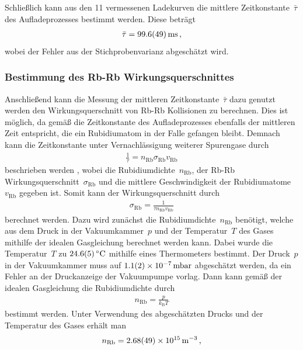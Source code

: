 \documentclass[11pt, a4paper]{article}
\numberwithin{equation}{section}
\begin{document}
Schließlich kann aus den 11 vermessenen Ladekurven die mittlere Zeitkonstante~$\bar{\tau}$ des Aufladeprozesses bestimmt werden.
Diese beträgt
\begin{align*}
	\bar{\tau} = \SI{99.6 +- 4.9}{ms} \, \text{,}
\end{align*}
wobei der Fehler aus der Stichprobenvarianz abgeschätzt wird.

\subsubsection{Bestimmung des Rb-Rb Wirkungsquerschnittes}
Anschließend kann die Messung der mittleren Zeitkonstante~$\bar{\tau}$ dazu genutzt werden den Wirkungsquerschnitt von Rb-Rb Kollisionen zu berechnen.
Dies ist möglich, da gemäß \cite{wieman} die Zeitkonstante des Aufladeprozesses ebenfalls der mittleren Zeit entspricht, die ein Rubidiumatom in der Falle gefangen bleibt.
Demnach kann die Zeitkonstante unter Vernachlässigung weiterer Spurengase durch 
\begin{align*}
	\frac{1}{\tau} = n_\mathrm{Rb}  \sigma_\mathrm{Rb}  v_\mathrm{Rb}
\end{align*}
beschrieben werden \cite{wieman}, wobei die Rubidiumdichte~$n_\mathrm{Rb}$, der Rb-Rb Wirkungsquerschnitt~$\sigma_\mathrm{Rb}$ und die mittlere Geschwindigkeit der Rubidiumatome~$v_\mathrm{Rb}$ gegeben ist.
Somit kann der Wirkungsquerschnitt durch
\begin{align}
	\sigma_\mathrm{Rb} = \frac{1}{\tau n_\mathrm{Rb} v_\mathrm{Rb}}
	\label{eq:cross_sec}
\end{align}
berechnet werden.
Dazu wird zunächst die Rubidiumdichte~$n_\mathrm{Rb}$ benötigt, welche aus dem Druck in der Vakuumkammer~$p$ und der Temperatur~$T$ des Gases mithilfe der idealen Gasgleichung berechnet werden kann.
Dabei wurde die Temperatur~$T$ zu $\SI{24.6 +- 0.5}{\degreeCelsius}$ mithilfe eines Thermometers bestimmt.
Der Druck~$p$ in der Vakuumkammer muss auf $\SI{1.1 +- 0.2e-7}{mbar}$ abgeschätzt werden, da ein Fehler an der Druckanzeige der Vakuumpumpe vorlag.
Dann kann gemäß der idealen Gasgleichung die Rubidiumdichte durch
\begin{align*}
	n_\mathrm{Rb} = \frac{p}{k_\mathrm{B} T}
\end{align*}
bestimmt werden.
Unter Verwendung des abgeschätzten Drucks und der Temperatur des Gases erhält man
\begin{align*}
	n_\mathrm{Rb} = \SI{2.68 +- 0.49e15}{\per\meter\cubed} \, \text{,}
\end{align*}
\end{document}
